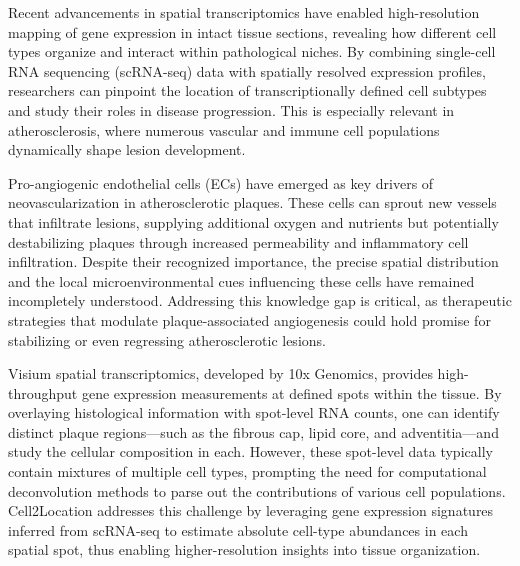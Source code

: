 \documentclass[a4paper,12pt]{article}
\begin{document}
Recent advancements in spatial transcriptomics have enabled high-resolution mapping of gene expression in intact tissue sections, revealing how different cell types organize and interact within pathological niches. By combining single-cell RNA sequencing (scRNA-seq) data with spatially resolved expression profiles, researchers can pinpoint the location of transcriptionally defined cell subtypes and study their roles in disease progression. This is especially relevant in atherosclerosis, where numerous vascular and immune cell populations dynamically shape lesion development.

Pro-angiogenic endothelial cells (ECs) have emerged as key drivers of neovascularization in atherosclerotic plaques. These cells can sprout new vessels that infiltrate lesions, supplying additional oxygen and nutrients but potentially destabilizing plaques through increased permeability and inflammatory cell infiltration. Despite their recognized importance, the precise spatial distribution and the local microenvironmental cues influencing these cells have remained incompletely understood. Addressing this knowledge gap is critical, as therapeutic strategies that modulate plaque-associated angiogenesis could hold promise for stabilizing or even regressing atherosclerotic lesions.

Visium spatial transcriptomics, developed by 10x Genomics, provides high-throughput gene expression measurements at defined spots within the tissue. By overlaying histological information with spot-level RNA counts, one can identify distinct plaque regions—such as the fibrous cap, lipid core, and adventitia—and study the cellular composition in each. However, these spot-level data typically contain mixtures of multiple cell types, prompting the need for computational deconvolution methods to parse out the contributions of various cell populations. Cell2Location \citep{Kleshchevnikov2022-vd} addresses this challenge by leveraging gene expression signatures inferred from scRNA-seq to estimate absolute cell-type abundances in each spatial spot, thus enabling higher-resolution insights into tissue organization.
\end{document}
